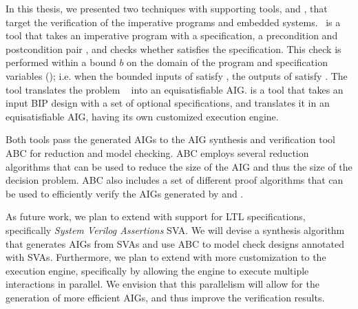 In this thesis, we presented two techniques with supporting tools, \mytool{} and \biptool{}, that target the verification of the imperative
programs and embedded systems.
\mytool~is a tool that takes 
an imperative program \Pm with a specification,
a precondition and postcondition pair \pair{\Pre}{\Post},
and checks
whether \Pm satisfies the specification. This check 
is performed  within a 
bound $b$ on the domain of the program and specification
variables (\prob);
i.e. when the bounded inputs of \Pm satisfy \Pre, 
the outputs of \Pm satisfy \Post. 
The tool translates the problem \prob~
into an equisatisfiable AIG.
\biptool{} is a tool that 
takes an input 
BIP design with a set of optional specifications, 
and translates it in an equisatisfiable AIG, having 
its own customized execution engine. 

Both tools pass the generated AIGs to the AIG synthesis
and verification tool ABC for
reduction and model checking. ABC employs several reduction 
algorithms that can be used to reduce the size of the 
AIG and thus the size of the decision problem. 
ABC also includes a set of different proof algorithms
that can be used to efficiently verify the AIGs generated
by \mytool{} and \biptool{}. 

As future work, we plan to extend \mytool{} with support 
for LTL specifications, specifically {\em System Verilog
Assertions} SVA. We will devise a synthesis algorithm
that generates AIGs from SVAs and use ABC to model check
designs annotated with SVAs. Furthermore, 
we plan to extend \biptool{} with more customization
to the execution engine, specifically by allowing the engine
to execute multiple interactions in parallel. We envision
that this parallelism will allow for the generation 
of more efficient AIGs, and thus improve the 
verification results.
